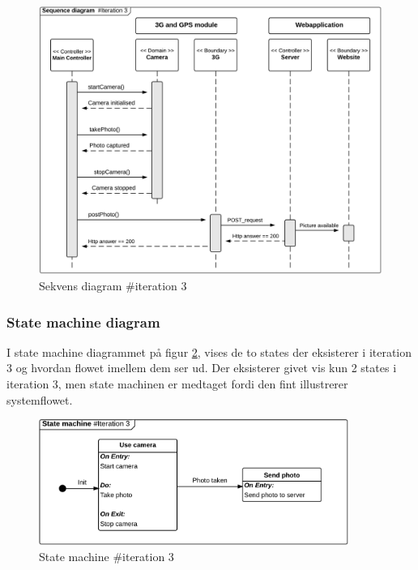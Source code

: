 \vspace{-0.2cm}
\begin{figure}[H]
	\centering
	\includegraphics[width=1\textwidth]{Billeder/sekvens/sekvens_iteration3}
	\caption{Sekvens diagram \#iteration 3}
	\label{fig:Sekvens_diagram_iteration3}
\end{figure}
\vspace{-0.2cm}

\subsubsection*{State machine diagram}
\vspace{-0.3cm}
I state machine diagrammet på figur \ref{fig:Statemachine_iteration3}, vises de to states der eksisterer i iteration 3 og hvordan flowet imellem dem ser ud. Der eksisterer givet vis kun 2 states i iteration 3, men state machinen er medtaget fordi den fint illustrerer systemflowet.

\vspace{-0.2cm}
\begin{figure}[H]
	\centering
	\includegraphics[width=0.9\textwidth]{Billeder/statemachine/State_iteration3.png}
	\caption{State machine \#iteration 3}
	\label{fig:Statemachine_iteration3}
\end{figure}


